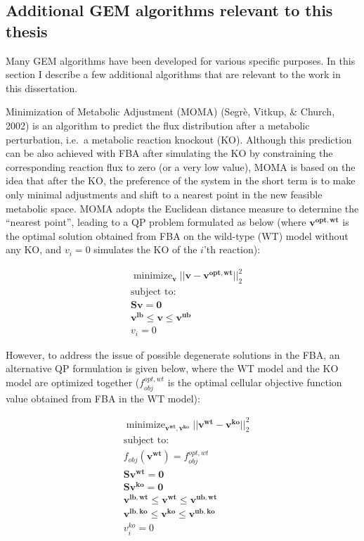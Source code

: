 \documentclass[12pt,twoside,openany,\mydriver]{thesis}  %
\DeclareMathOperator*{\minimize}{minimize}
\begin{document}
\hypertarget{intro-gem-algo}{%
\subsection{Additional GEM algorithms relevant to this thesis}\label{intro-gem-algo}}

Many GEM algorithms have been developed for various specific purposes. In this section I describe a few additional algorithms that are relevant to the work in this dissertation.

Minimization of Metabolic Adjustment (MOMA) (Segrè, Vitkup, \& Church, 2002) is an algorithm to predict the flux distribution after a metabolic perturbation, i.e.~a metabolic reaction knockout (KO). Although this prediction can be also achieved with FBA after simulating the KO by constraining the corresponding reaction flux to zero (or a very low value), MOMA is based on the idea that after the KO, the preference of the system in the short term is to make only minimal adjustments and shift to a nearest point in the new feasible metabolic space. MOMA adopts the Euclidean distance measure to determine the ``nearest point'', leading to a QP problem formulated as below (where \(\mathbf{v^{opt,wt}}\) is the optimal solution obtained from FBA on the wild-type (WT) model without any KO, and \(v_{i} = 0\) simulates the KO of the \(i\)'th reaction):

\[
\begin{aligned}
&\minimize_{\mathbf{v}} ||\mathbf{v}-\mathbf{v^{opt,wt}}||_2^2 \\
&\text{subject to:} \\
&\mathbf{Sv = 0} \\
&\mathbf{v^{lb} \le v \le v^{ub}} \\
&v_{i} = 0
\end{aligned}
\]

However, to address the issue of possible degenerate solutions in the FBA, an alternative QP formulation is given below, where the WT model and the KO model are optimized together (\(f_{obj}^{opt,wt}\) is the optimal cellular objective function value obtained from FBA in the WT model):

\[
\begin{aligned}
&\minimize_{\mathbf{v^{wt},v^{ko}}} ||\mathbf{v^{wt}}-\mathbf{v^{ko}}||_2^2 \\
&\text{subject to:} \\
&f_{obj}(\mathbf{v^{wt}}) = f_{obj}^{opt,wt}\\
&\mathbf{Sv^{wt} = 0} \\
&\mathbf{Sv^{ko} = 0} \\
&\mathbf{v^{lb,wt} \le v^{wt} \le v^{ub,wt}} \\
&\mathbf{v^{lb,ko} \le v^{ko} \le v^{ub,ko}} \\
&v^{ko}_{i} = 0
\end{aligned}
\]
\end{document}
